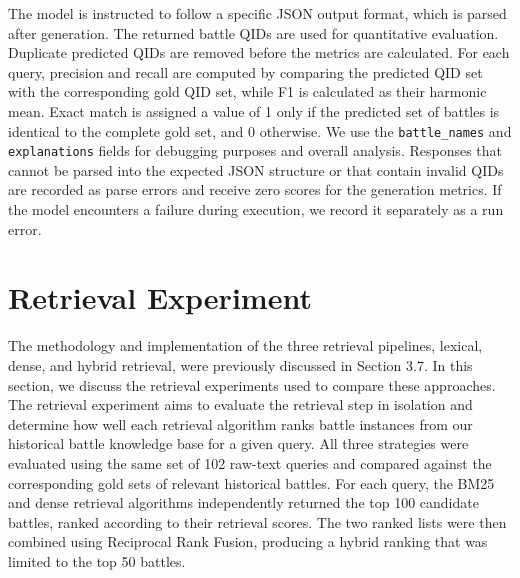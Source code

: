 The model is instructed to follow a specific JSON output format, which is parsed after generation. The returned battle QIDs are used for quantitative evaluation. Duplicate predicted QIDs are removed before the metrics are calculated. For each query, precision and recall are computed by comparing the predicted QID set with the corresponding gold QID set, while F1 is calculated as their harmonic mean. Exact match is assigned a value of 1 only if the predicted set of battles is identical to the complete gold set, and 0 otherwise. We use the \texttt{battle\_names} and \texttt{explanations} fields for debugging purposes and overall analysis. Responses that cannot be parsed into the expected JSON structure or that contain invalid QIDs are recorded as parse errors and receive zero scores for the generation metrics. If the model encounters a failure during execution, we record it separately as a run error.
\section{Retrieval Experiment}
The methodology and implementation of the three retrieval pipelines, lexical, dense, and hybrid retrieval, were previously discussed in Section 3.7. In this section, we discuss the retrieval experiments used to compare these approaches. The retrieval experiment aims to evaluate the retrieval step in isolation and determine how well each retrieval algorithm ranks battle instances from our historical battle knowledge base for a given query. All three strategies were evaluated using the same set of 102 raw-text queries and compared against the corresponding gold sets of relevant historical battles. For each query, the BM25 and dense retrieval algorithms independently returned the top 100 candidate battles, ranked according to their retrieval scores. The two ranked lists were then combined using Reciprocal Rank Fusion, producing a hybrid ranking that was limited to the top 50 battles.

